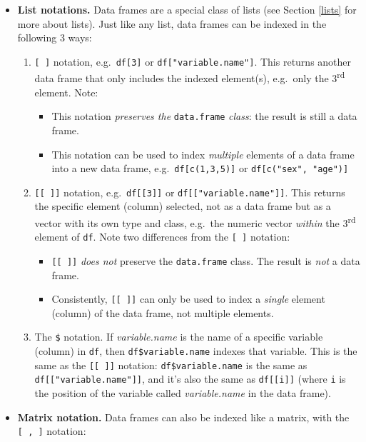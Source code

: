 \documentclass[
]{book}
\providecommand{\tightlist}{%
  \setlength{\itemsep}{0pt}\setlength{\parskip}{0pt}}
\begin{document}
\begin{itemize}
\tightlist
\item
  \textbf{List notations.} Data frames are a special class of lists (see Section \ref{lists} for more about lists). Just like any list, data frames can be indexed in the following 3 ways:

  \begin{enumerate}
  \def\labelenumi{\arabic{enumi}.}
  \tightlist
  \item
    \texttt{{[}\ {]}} notation, e.g.~\texttt{df{[}3{]}} or \texttt{df{[}"variable.name"{]}}. This returns another data frame that only includes the indexed element(s), e.g.~only the 3\textsuperscript{rd} element. Note:

    \begin{itemize}
    \tightlist
    \item
      This notation \emph{preserves the} \texttt{data.frame} \emph{class}: the result is still a data frame.
    \item
      This notation can be used to index \emph{multiple} elements of a data frame into a new data frame, e.g.~\texttt{df{[}c(1,3,5){]}} or \texttt{df{[}c("sex",\ "age"){]}}
    \end{itemize}
  \item
    \texttt{{[}{[}\ {]}{]}} notation, e.g.~\texttt{df{[}{[}3{]}{]}} or \texttt{df{[}{[}"variable.name"{]}{]}}. This returns the specific element (column) selected, not as a data frame but as a vector with its own type and class, e.g.~the numeric vector \emph{within} the 3\textsuperscript{rd} element of \texttt{df}. Note two differences from the \texttt{{[}\ {]}} notation:

    \begin{itemize}
    \tightlist
    \item
      \texttt{{[}{[}\ {]}{]}} \emph{does not} preserve the \texttt{data.frame} class. The result is \emph{not} a data frame.
    \item
      Consistently, \texttt{{[}{[}\ {]}{]}} can only be used to index a \emph{single} element (column) of the data frame, not multiple elements.
    \end{itemize}
  \item
    The \texttt{\$} notation. If \emph{variable.name} is the name of a specific variable (column) in \texttt{df}, then \texttt{df\$variable.name} indexes that variable. This is the same as the \texttt{{[}{[}\ {]}{]}} notation: \texttt{df\$variable.name} is the same as \texttt{df{[}{[}"variable.name"{]}{]}}, and it's also the same as \texttt{df{[}{[}i{]}{]}} (where \texttt{i} is the position of the variable called \emph{variable.name} in the data frame).
  \end{enumerate}
\item
  \textbf{Matrix notation.} Data frames can also be indexed like a matrix, with the \texttt{{[}\ ,\ {]}} notation:


\end{itemize}
\end{document}
